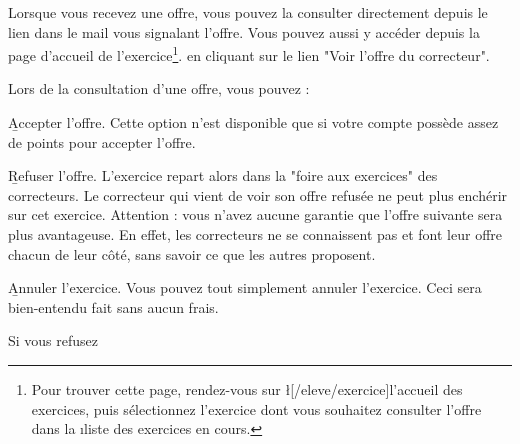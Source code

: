 ﻿Lorsque vous recevez une offre, vous pouvez la consulter directement depuis le lien dans le mail vous signalant l'offre. Vous pouvez aussi y accéder depuis la page d'accueil de l'exercice\footnote{Pour trouver cette page, rendez-vous sur \l[/eleve/exercice]{l'accueil des exercices}, puis sélectionnez l'exercice dont vous souhaitez consulter l'offre dans la \i{liste des exercices en cours}.}. en cliquant sur le lien "Voir l'offre du correcteur".

Lors de la consultation d'une offre, vous pouvez :
\item \b{Accepter l'offre}. Cette option n'est disponible que si votre compte possède assez de points pour accepter l'offre.
\item \b{Refuser l'offre}. L'exercice repart alors dans la "foire aux exercices" des correcteurs. Le correcteur qui vient de voir son offre refusée ne peut plus enchérir sur cet exercice. Attention : vous n'avez aucune garantie que l'offre suivante sera plus avantageuse. En effet, les correcteurs ne se connaissent pas et font leur offre chacun de leur côté, sans savoir ce que les autres proposent.
\item \b{Annuler l'exercice}. Vous pouvez tout simplement annuler l'exercice. Ceci sera bien-entendu fait sans aucun frais.

Si vous refusez %